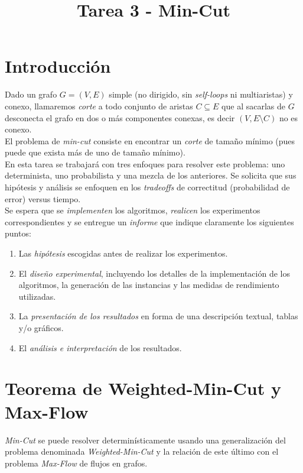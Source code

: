 \documentclass[dcc,uchile]{fcfmcourse}
\title{Tarea 3 - Min-Cut}
\begin{document}
\captionsetup[table]{name=Tabla}
\captionsetup[table]{name=Figura}

\maketitle
\vspace{-1ex}
\section{Introducción}
Dado un grafo $G = (V,E)$ simple (no dirigido, sin \textit{self-loops} ni multiaristas) y conexo, llamaremos \textit{corte} a todo conjunto de aristas $C\subseteq E$ que al sacarlas de $G$ desconecta el grafo en dos o más componentes conexas, es decir $(V,E\setminus C)$ no es conexo.\\ 
El problema de \textit{min-cut} consiste en encontrar un \textit{corte} de tamaño mínimo (pues puede que exista más de uno de tamaño mínimo).\\

En esta tarea se trabajará con tres enfoques para resolver este problema: uno determinista, uno probabilista y una mezcla de los anteriores. Se solicita que sus hipótesis y análisis se enfoquen en los \textit{tradeoffs} de correctitud (probabilidad de error) versus tiempo.\\
Se espera que se \textit{implementen} los algoritmos, \textit{realicen} los experimentos correspondientes y se entregue un \textit{informe} que indique claramente los siguientes puntos:
\begin{enumerate}[1.]
    \item Las \textit{hipótesis} escogidas antes de realizar los experimentos.
    \item El \textit{diseño experimental}, incluyendo los detalles de la implementación de los algoritmos, la generación de las instancias y las medidas de rendimiento utilizadas.
    \item La \textit{presentación de los resultados} en forma de una descripción textual, tablas y/o gráficos.
    \item El \textit{análisis e interpretación} de los resultados.
\end{enumerate}

\section*{Teorema de Weighted-Min-Cut y Max-Flow}
\textit{Min-Cut} se puede resolver determinísticamente usando una generalización del problema denominada \textit{Weighted-Min-Cut} y la relación de este último con el problema \textit{Max-Flow} de flujos en grafos.
\end{document}
